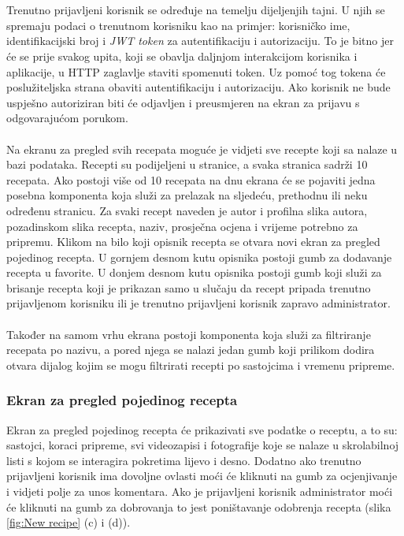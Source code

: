 \documentclass[times, utf8, zavrsni]{fer}
\begin{document}
\\\\
Trenutno prijavljeni korisnik se određuje na temelju dijeljenjih tajni.
U njih se spremaju podaci o trenutnom korisniku kao na primjer: korisničko ime, identifikacijski
broj i \textit{JWT token} za autentifikaciju i autorizaciju.
To je bitno jer će se prije svakog upita, koji se obavlja daljnjom interakcijom
korisnika i aplikacije, u HTTP zaglavlje staviti spomenuti token. Uz pomoć tog tokena će
poslužiteljska strana obaviti autentifikaciju i autorizaciju. Ako korisnik ne bude uspješno
autoriziran biti će odjavljen i preusmjeren na ekran za prijavu s odgovarajućom porukom.
\\\\
Na ekranu za pregled svih recepata moguće je vidjeti sve recepte koji sa nalaze u bazi podataka. Recepti su podijeljeni u stranice,
a svaka stranica sadrži 10 recepata. Ako postoji više od 10 recepata na dnu ekrana će se pojaviti
jedna posebna komponenta koja služi za prelazak na sljedeću, prethodnu ili neku određenu stranicu.
Za svaki recept naveden je autor i profilna slika autora, pozadinskom slika recepta, naziv,
prosječna ocjena i vrijeme potrebno za pripremu. Klikom na bilo koji opisnik recepta se otvara novi ekran
za pregled pojedinog recepta. U gornjem desnom kutu opisnika postoji
gumb za dodavanje recepta u favorite. U donjem desnom kutu opisnika postoji gumb koji služi za brisanje recepta koji
je prikazan samo u slučaju da recept pripada trenutno prijavljenom korisniku ili je trenutno prijavljeni
korisnik zapravo administrator.
\\\\
Također na samom vrhu ekrana postoji komponenta koja služi za filtriranje recepata po nazivu,
a pored njega se nalazi jedan gumb koji prilikom dodira otvara dijalog kojim
se mogu filtrirati recepti po sastojcima i vremenu pripreme.


\subsubsection{Ekran za pregled pojedinog recepta}
Ekran za pregled pojedinog recepta će prikazivati sve podatke o receptu, a to su:
sastojci, koraci pripreme, svi videozapisi i fotografije
koje se nalaze u skrolabilnoj listi s kojom se interagira pokretima lijevo i desno. Dodatno ako
trenutno prijavljeni korisnik ima dovoljne ovlasti moći će kliknuti na gumb za ocjenjivanje i
vidjeti polje za unos komentara. Ako je prijavljeni korisnik administrator moći će kliknuti na
gumb za dobrovanja to jest poništavanje odobrenja recepta (slika \ref{fig:New recipe} (c) i (d)).
\end{document}
